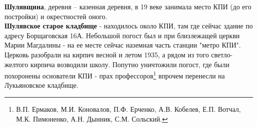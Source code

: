\textbf{Шулявщина}, деревня – казенная деревня, в 19 веке занимала место КПИ (до его постройки) и окрестностей оного.\\

\textbf{Шулявское старое кладбище} - находилось около КПИ, там где сейчас здание по адресу Борщаговская 16А. Небольшой погост был и при близлежащей церкви Марии Магдалины - на ее месте сейчас наземная часть станции "метро КПИ". Церковь разобрали на кирпич весной и летом 1935, а рядом из того светло-желтого кирпича возводили школу. Попутно уничтожили погост, где были похоронены основатели КПИ - прах профессоров\footnote{В.П. Ермаков, М.И. Коновалов, П.Ф. Ерченко, А.В. Кобелев, Е.П. Вотчал, М.К. Пимоненко, А.Н. Дынник, С.М. Сольский.} впрочем перенесли на Лукьяновское кладбище.



